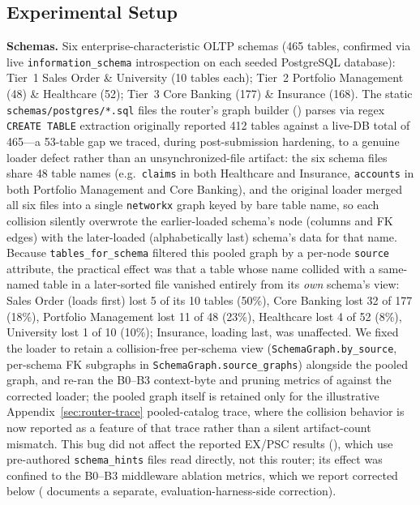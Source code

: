 \documentclass[twocolumn]{svjour3}
\begin{document}
\subsection{Experimental Setup}

\textbf{Schemas.} Six enterprise-characteristic OLTP schemas (465 tables, confirmed via live \texttt{information\_schema} introspection on each seeded PostgreSQL database): Tier~1 Sales Order \& University (10 tables each); Tier~2 Portfolio Management (48) \& Healthcare (52); Tier~3 Core Banking (177) \& Insurance (168).
The static \texttt{schemas/postgres/*.sql} files the router's graph builder () parses via regex \texttt{CREATE TABLE} extraction originally reported 412 tables against a live-DB total of 465---a 53-table gap we traced, during post-submission hardening, to a genuine loader defect rather than an unsynchronized-file artifact: the six schema files share 48 table names (e.g.\ \texttt{claims} in both Healthcare and Insurance, \texttt{accounts} in both Portfolio Management and Core Banking), and the original loader merged all six files into a single \texttt{networkx} graph keyed by bare table name, so each collision silently overwrote the earlier-loaded schema's node (columns and FK edges) with the later-loaded (alphabetically last) schema's data for that name.
Because \texttt{tables\_for\_schema} filtered this pooled graph by a per-node \texttt{source} attribute, the practical effect was that a table whose name collided with a same-named table in a later-sorted file vanished entirely from its \emph{own} schema's view: Sales Order (loads first) lost 5 of its 10 tables (50\%), Core Banking lost 32 of 177 (18\%), Portfolio Management lost 11 of 48 (23\%), Healthcare lost 4 of 52 (8\%), University lost 1 of 10 (10\%); Insurance, loading last, was unaffected.
We fixed the loader to retain a collision-free per-schema view (\texttt{SchemaGraph.by\_source}, per-schema FK subgraphs in \texttt{SchemaGraph.source\_graphs}) alongside the pooled graph, and re-ran the B0--B3 context-byte and pruning metrics of  against the corrected loader; the pooled graph itself is retained only for the illustrative Appendix~\ref{sec:router-trace} pooled-catalog trace, where the collision behavior is now reported as a feature of that trace rather than a silent artifact-count mismatch.
This bug did not affect the reported EX/PSC results (), which use pre-authored \texttt{schema\_hints} files read directly, not this router; its effect was confined to the B0--B3 middleware ablation metrics, which we report corrected below ( documents a separate, evaluation-harness-side correction).
\end{document}
